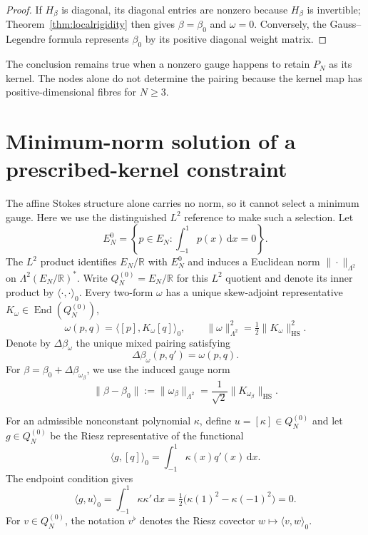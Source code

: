 \documentclass[11pt,a4paper]{article}
\theoremstyle{definition}
\theoremstyle{remark}
\newcommand{\R}{\mathbb{R}}
\newcommand{\dd}{\,\mathrm{d}}
\begin{document}
\begin{proof}
If $H_\beta$ is diagonal, its diagonal entries are nonzero because $H_\beta$ is invertible;
Theorem~\ref{thm:localrigidity} then gives $\beta=\beta_0$ and $\omega=0$.  Conversely,
the Gauss--Legendre formula represents $\beta_0$ by its positive diagonal weight matrix.
\end{proof}

The conclusion remains true when a nonzero gauge happens to retain $P_N$ as its kernel.
The nodes alone do not determine the pairing because the kernel map has positive-dimensional
fibres for $N\geq3$.

\section{Minimum-norm solution of a prescribed-kernel constraint}\label{sec:metric}

The affine Stokes structure alone carries no norm, so it cannot select a minimum gauge.
Here we use the distinguished $L^2$ reference to make such a selection.  Let
\[
 E_N^0=\left\{p\in E_N:\int_{-1}^{1}p(x)\dd x=0\right\}.
\]
The $L^2$ product identifies $E_N/\R$ with $E_N^0$ and induces a Euclidean norm
$\|\cdot\|_{\Lambda^2}$ on $\Lambda^2(E_N/\R)^*$.  Write
$Q_N^{(0)}=E_N/\R$ for this $L^2$ quotient and denote its inner product by
$\langle\cdot,\cdot\rangle_0$.  Every two-form $\omega$ has a unique skew-adjoint
representative $K_\omega\in\operatorname{End}(Q_N^{(0)})$,
\begin{equation}\label{eq:quotientriesz}
 \omega(p,q)=\langle[p],K_\omega[q]\rangle_0,
 \qquad
 \|\omega\|_{\Lambda^2}^2=\tfrac12\|K_\omega\|_{\mathrm{HS}}^2.
\end{equation}
Denote by $\Delta\beta_\omega$ the unique mixed pairing satisfying
\begin{equation}\label{eq:deltabetaomega}
 \Delta\beta_\omega(p,q')=\omega(p,q).
\end{equation}
For $\beta=\beta_0+\Delta\beta_{\omega_\beta}$, we use the induced gauge norm
\begin{equation}\label{eq:pairinggaugenorm}
 \boxed{
 \|\beta-\beta_0\|:=\|\omega_\beta\|_{\Lambda^2}
 =\frac1{\sqrt2}\|K_{\omega_\beta}\|_{\mathrm{HS}}.}
\end{equation}

For an admissible nonconstant polynomial $\kappa$, define
$u=[\kappa]\in Q_N^{(0)}$ and let $g\in Q_N^{(0)}$ be the Riesz representative of the
functional
\begin{equation}\label{eq:gdefinition}
 \langle g,[q]\rangle_0=\int_{-1}^{1}\kappa(x)q'(x)\dd x.
\end{equation}
The endpoint condition gives
\begin{equation}\label{eq:guorthogonal}
 \langle g,u\rangle_0
 =\int_{-1}^{1}\kappa\kappa'\dd x
 =\tfrac12\bigl(\kappa(1)^2-\kappa(-1)^2\bigr)=0.
\end{equation}
For $v\in Q_N^{(0)}$, the notation $v^\flat$ denotes the Riesz covector
$w\mapsto\langle v,w\rangle_0$.
\end{document}
